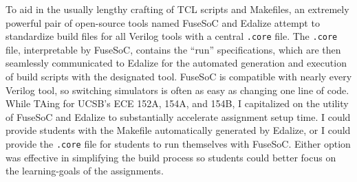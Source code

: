To aid in the usually lengthy crafting of TCL scripts and Makefiles, an extremely powerful pair of open-source tools named FuseSoC and Edalize \cite{fusesocGitHub, edalizeGitHub} attempt to standardize build files for all Verilog tools with a central \texttt{.core} file. The \texttt{.core} file, interpretable by FuseSoC, contains the ``run'' specifications, which are then seamlessly communicated to Edalize for the automated generation and execution of build scripts with the designated tool. FuseSoC is compatible with nearly every Verilog tool, so switching simulators is often as easy as changing one line of code. While TAing for UCSB's ECE 152A, 154A, and 154B, I capitalized on the utility of FuseSoC and Edalize to substantially accelerate assignment setup time. I could provide students with the Makefile automatically generated by Edalize, or I could provide the \texttt{.core} file for students to run themselves with FuseSoC. Either option was effective in simplifying the build process so students could better focus on the learning-goals of the assignments.
